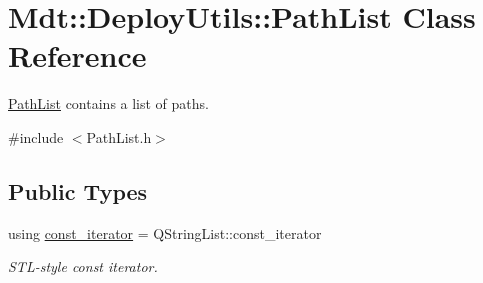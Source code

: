 \hypertarget{class_mdt_1_1_deploy_utils_1_1_path_list}{}\section{Mdt\+:\+:Deploy\+Utils\+:\+:Path\+List Class Reference}
\label{class_mdt_1_1_deploy_utils_1_1_path_list}


\hyperlink{class_mdt_1_1_deploy_utils_1_1_path_list}{Path\+List} contains a list of paths.  




{\ttfamily \#include $<$Path\+List.\+h$>$}

\subsection*{Public Types}
\begin{DoxyCompactItemize}
\item 
using \hyperlink{class_mdt_1_1_deploy_utils_1_1_path_list_a2666c4c9348c4f7a28014d4de9599717}{const\+\_\+iterator} = Q\+String\+List\+::const\+\_\+iterator
\begin{DoxyCompactList}\small\item\em S\+T\+L-\/style const iterator. \end{DoxyCompactList}\end{DoxyCompactItemize}
